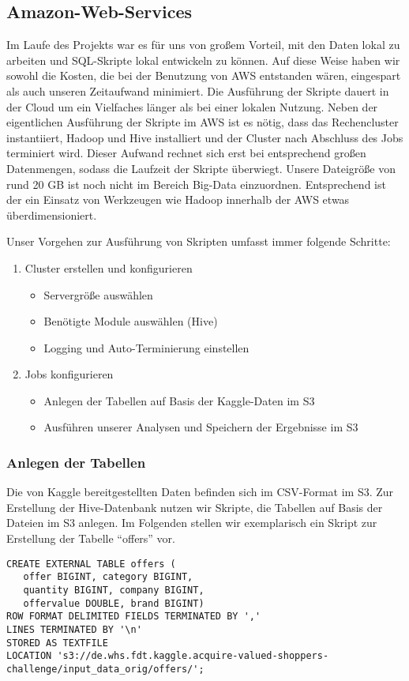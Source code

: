 \subsection{Amazon-Web-Services}
Im Laufe des Projekts war es für uns von großem Vorteil, mit den Daten lokal zu arbeiten und SQL-Skripte lokal entwickeln zu können. Auf diese Weise haben wir sowohl die Kosten, die bei der Benutzung von AWS entstanden wären, eingespart als auch unseren Zeitaufwand minimiert. Die Ausführung der Skripte dauert in der Cloud um ein Vielfaches länger als bei einer lokalen Nutzung. Neben der eigentlichen Ausführung der Skripte im AWS ist es nötig, dass das Rechencluster instantiiert, Hadoop und Hive installiert und der Cluster nach Abschluss des Jobs terminiert wird. Dieser Aufwand rechnet sich erst bei entsprechend großen Datenmengen, sodass die Laufzeit der Skripte überwiegt. Unsere Dateigröße von rund 20 GB ist noch nicht im Bereich Big-Data einzuordnen. Entsprechend ist der ein Einsatz von Werkzeugen wie Hadoop innerhalb der AWS etwas überdimensioniert.

Unser Vorgehen zur Ausführung von Skripten umfasst immer folgende Schritte:
\begin{enumerate}
\item Cluster erstellen und konfigurieren
	\begin{itemize}
	\item Servergröße auswählen
	\item Benötigte Module auswählen (Hive)
	\item Logging und Auto-Terminierung einstellen
	\end{itemize}
\item Jobs konfigurieren
	\begin{itemize}
	\item Anlegen der Tabellen auf Basis der Kaggle-Daten im S3
	\item Ausführen unserer Analysen und Speichern der Ergebnisse im S3
	\end{itemize}
\end{enumerate}

\subsubsection{Anlegen der Tabellen}
Die von Kaggle bereitgestellten Daten befinden sich im CSV-Format im S3.
Zur Erstellung der Hive-Datenbank nutzen wir Skripte, die Tabellen auf Basis der Dateien im S3 anlegen. Im Folgenden stellen wir exemplarisch ein Skript zur Erstellung der Tabelle "`offers"' vor. 
\\
\begin{lstlisting}[style=hive]
CREATE EXTERNAL TABLE offers (
   offer BIGINT, category BIGINT, 
   quantity BIGINT, company BIGINT, 
   offervalue DOUBLE, brand BIGINT)
ROW FORMAT DELIMITED FIELDS TERMINATED BY ','
LINES TERMINATED BY '\n'
STORED AS TEXTFILE
LOCATION 's3://de.whs.fdt.kaggle.acquire-valued-shoppers- challenge/input_data_orig/offers/';
\end{lstlisting}

